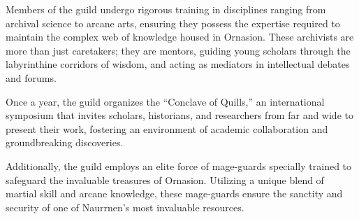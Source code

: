 \documentclass[11pt]{article}
\begin{document}
\begin{enumerate}
\begin{enumerate}
Members of the guild undergo rigorous training in disciplines ranging from archival science to arcane arts, ensuring they possess the expertise required to maintain the complex web of knowledge housed in Ornasion. These archivists are more than just caretakers; they are mentors, guiding young scholars through the labyrinthine corridors of wisdom, and acting as mediators in intellectual debates and forums.

Once a year, the guild organizes the ``Conclave of Quills,'' an international symposium that invites scholars, historians, and researchers from far and wide to present their work, fostering an environment of academic collaboration and groundbreaking discoveries.

Additionally, the guild employs an elite force of mage-guards specially trained to safeguard the invaluable treasures of Ornasion. Utilizing a unique blend of martial skill and arcane knowledge, these mage-guards ensure the sanctity and security of one of Naurrnen's most invaluable resources.


\end{enumerate}
\end{enumerate}
\end{document}
